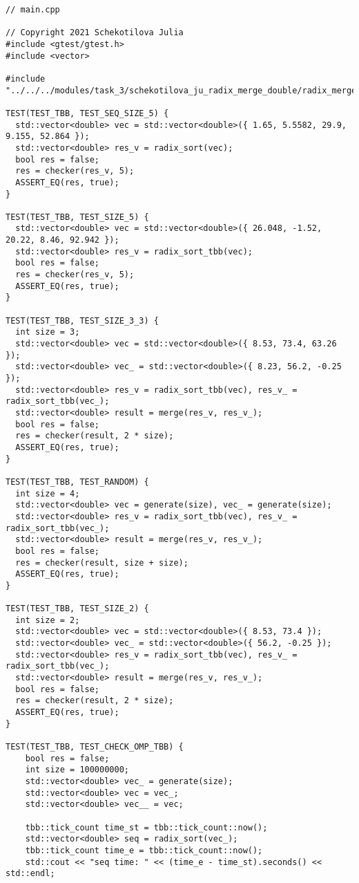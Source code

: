 \documentclass{report}
\begin{document}
\begin{lstlisting}
// main.cpp

// Copyright 2021 Schekotilova Julia
#include <gtest/gtest.h>
#include <vector>

#include "../../../modules/task_3/schekotilova_ju_radix_merge_double/radix_merge_double.h"

TEST(TEST_TBB, TEST_SEQ_SIZE_5) {
  std::vector<double> vec = std::vector<double>({ 1.65, 5.5582, 29.9, 9.155, 52.864 });
  std::vector<double> res_v = radix_sort(vec);
  bool res = false;
  res = checker(res_v, 5);
  ASSERT_EQ(res, true);
}

TEST(TEST_TBB, TEST_SIZE_5) {
  std::vector<double> vec = std::vector<double>({ 26.048, -1.52, 20.22, 8.46, 92.942 });
  std::vector<double> res_v = radix_sort_tbb(vec);
  bool res = false;
  res = checker(res_v, 5);
  ASSERT_EQ(res, true);
}

TEST(TEST_TBB, TEST_SIZE_3_3) {
  int size = 3;
  std::vector<double> vec = std::vector<double>({ 8.53, 73.4, 63.26 });
  std::vector<double> vec_ = std::vector<double>({ 8.23, 56.2, -0.25 });
  std::vector<double> res_v = radix_sort_tbb(vec), res_v_ = radix_sort_tbb(vec_);
  std::vector<double> result = merge(res_v, res_v_);
  bool res = false;
  res = checker(result, 2 * size);
  ASSERT_EQ(res, true);
}

TEST(TEST_TBB, TEST_RANDOM) {
  int size = 4;
  std::vector<double> vec = generate(size), vec_ = generate(size);
  std::vector<double> res_v = radix_sort_tbb(vec), res_v_ = radix_sort_tbb(vec_);
  std::vector<double> result = merge(res_v, res_v_);
  bool res = false;
  res = checker(result, size + size);
  ASSERT_EQ(res, true);
}

TEST(TEST_TBB, TEST_SIZE_2) {
  int size = 2;
  std::vector<double> vec = std::vector<double>({ 8.53, 73.4 });
  std::vector<double> vec_ = std::vector<double>({ 56.2, -0.25 });
  std::vector<double> res_v = radix_sort_tbb(vec), res_v_ = radix_sort_tbb(vec_);
  std::vector<double> result = merge(res_v, res_v_);
  bool res = false;
  res = checker(result, 2 * size);
  ASSERT_EQ(res, true);
}

TEST(TEST_TBB, TEST_CHECK_OMP_TBB) {
	bool res = false;
	int size = 100000000;
	std::vector<double> vec_ = generate(size);
	std::vector<double> vec = vec_;
	std::vector<double> vec__ = vec;

	tbb::tick_count time_st = tbb::tick_count::now();
	std::vector<double> seq = radix_sort(vec_);
	tbb::tick_count time_e = tbb::tick_count::now();
	std::cout << "seq time: " << (time_e - time_st).seconds() << std::endl;


\end{lstlisting}
\end{document}
